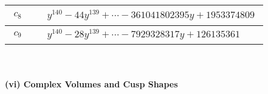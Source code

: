 \documentclass[1p]{elsarticle_modified}
\theoremstyle{definition}
\begin{document}
\begin{tabular}{m{50pt}|m{274pt}}
\hline $$\begin{aligned}c_{8}\end{aligned}$$&$\begin{aligned}
&y^{140}-44 y^{139}+\cdots-361041802395 y+1953374809
\end{aligned}$\\
\hline $$\begin{aligned}c_{9}\end{aligned}$$&$\begin{aligned}
&y^{140}-28 y^{139}+\cdots-7929328317 y+126135361
\end{aligned}$\\
\hline
\end{tabular}\\~\\
\newpage\flushleft \textbf{(vi) Complex Volumes and Cusp Shapes}
\end{document}
